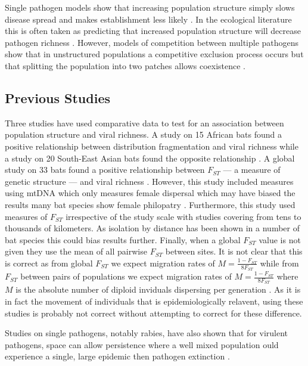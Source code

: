 Single pathogen models show that increasing population structure simply slows disease spread and makes establishment less likely \cite{}.
In the ecological literature this is often taken as predicting that increased population structure will decrease pathogen richness \cite{}.
However, models of competition between multiple pathogens show that in unstructured populations a competitive exclusion process occurs but that splitting the population into two patches allows coexistence \cite{}.


\subsection{Previous Studies}

Three studies have used comparative data to test for an association between population structure and viral richness.
A study on 15 African bats found a positive relationship between distribution fragmentation and viral richness \cite{maganga2014bat} while a study on 20 South-East Asian bats found the opposite relationship \cite{gay2014parasite}. 
A global study on 33 bats found a positive relationship between $F_{ST}$ --- a measure of genetic structure --- and viral richness \cite{turmelle2009correlates}. 
However, this study included measures using mtDNA which only measures female dispersal which may have biased the results many bat species show female philopatry \cite{kerth2002extreme, hulva2010mechanisms}.
Furthermore, this study used measures of $F_{ST}$ irrespective of the study scale with studies covering from tens \cite{mccracken1981social} to thousands \cite{petit1999male} of kilometers.
As isolation by distance has been shown in a number of bat species \cite{burland1999population, hulva2010mechanisms, o2015genetic, vonhof2015range} this could bias results further.
Finally, when a global $F_{ST}$ value is not given they use the mean of all pairwise $F_{ST}$ between sites.
It is not clear that this is correct as from global $F_{ST}$ we expect migration rates of $M = \frac{1-F_{ST}}{8F_{ST}}$ while from $F_{ST}$ between pairs of populations we expect migration rates of $M = \frac{1-F_{ST}}{8F_{ST}}$ where $M$ is the absolute number of diploid inviduals dispersing per generation \cite{slatkin1995measure}.
As it is in fact the movement of individuals that is epidemiologically relavent, using these studies is probably not correct without attempting to correct for these difference.

Studies on single pathogens, notably rabies, have also shown that for virulent pathogens, space can allow persistence where a well mixed population ould experience a single, large epidemic then pathogen extinction \cite{rabiespaper, colizza, pons2014insights}.

